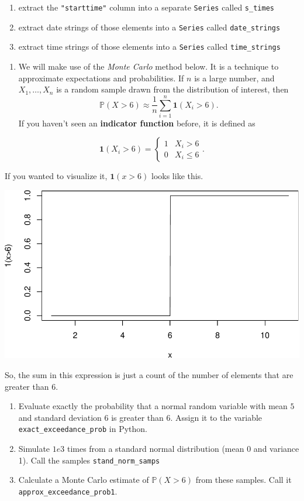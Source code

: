 \documentclass[
  12pt,
]{krantz}
\providecommand{\tightlist}{%
  \setlength{\itemsep}{0pt}\setlength{\parskip}{0pt}}
\begin{document}
\begin{enumerate}
\def\labelenumi{\alph{enumi}.}
\item
  extract the \texttt{"starttime"} column into a separate \texttt{Series} called \texttt{s\_times}
\item
  extract date strings of those elements into a \texttt{Series} called \texttt{date\_strings}
\item
  extract time strings of those elements into a \texttt{Series} called \texttt{time\_strings}
\end{enumerate}

\begin{enumerate}
\def\labelenumi{\arabic{enumi}.}
\setcounter{enumi}{2}
\tightlist
\item
  We will make use of the \emph{Monte Carlo} \citep{monte-carlo-stat-methods} method below. It is a technique to approximate expectations and probabilities. If \(n\) is a large number, and \(X_1, \ldots, X_n\) is a random sample drawn from the distribution of interest, then
  \[
  \mathbb{P}(X > 6) \approx \frac{1}{n}\sum_{i=1}^n \mathbf{1}(X_i > 6).
  \]
  If you haven't seen an \textbf{indicator function} before, it is defined as
\end{enumerate}

\[
\mathbf{1}(X_i > 6)
=
\begin{cases}
1 & X_i > 6 \\
0 & X_i \le 6
\end{cases}.
\]

If you wanted to visualize it, \(\mathbf{1}(x > 6)\) looks like this.

\begin{center}\includegraphics[width=0.5\linewidth]{r_and_python_book_files/figure-latex/unnamed-chunk-47-1} \end{center}

So, the sum in this expression is just a count of the number of elements that are greater than \(6\).

\begin{enumerate}
\def\labelenumi{\alph{enumi}.}
\item
  Evaluate exactly the probability that a normal random variable with mean \(5\) and standard deviation \(6\) is greater than \(6\). Assign it to the variable \texttt{exact\_exceedance\_prob} in Python.
\item
  Simulate \(1e3\) times from a standard normal distribution (mean 0 and variance 1). Call the samples \texttt{stand\_norm\_samps}
\item
  Calculate a Monte Carlo estimate of \(\mathbb{P}(X > 6)\) from these samples. Call it \texttt{approx\_exceedance\_prob1}.
\end{enumerate}
\end{document}
